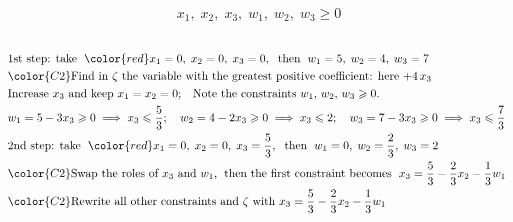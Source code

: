 \documentclass[usenames,dvipsnames,8pt]{beamer}%
\begin{document}
\begin{frame}
\begin{columns}
\begin{column}{0.5\textwidth}
\begin{align*}
        x_1,\;x_2,\;x_3,\;w_1,\;w_2,\;w_3\geqslant 0
      \end{align*}
    \end{column}
  \end{columns}
  \begin{align*}
    &\text{1st step: take }\;{\color{red}x_1 = 0,\;x_2 = 0,\; x_3 = 0},\;\text{ then }\;w_1 = 5,\;w_2 = 4,\;w_3 = 7 \\
    &{\color{C2}\text{Find in $\zeta$ the variable with the greatest positive coefficient: here $+4\,x_3$}} \\
    &\text{Increase $x_3$ and keep $x_1 = x_2 = 0$;\quad Note the constraints $w_1,\,w_2,\,w_3\geqslant 0$.} \\
    &w_1 = 5-3x_3\geqslant 0\;\Longrightarrow\; x_3\leqslant\frac{5}{3};\quad w_2 = 4-2x_3\geqslant 0\;\Longrightarrow\; x_3\leqslant 2;\quad w_3 = 7-3x_3\geqslant 0\;\Longrightarrow\; x_3\leqslant\frac{7}{3}\\
    &\text{2nd step: take }\;{\color{red}x_1 = 0,\; x_2 = 0,\; x_3 = \frac{5}{3}},\;\text{ then }\;w_1 = 0,\;w_2 = \frac{2}{3},\;w_3 = 2\\
    &{\color{C2}\text{Swap the roles of $x_3$ and $w_1$,\;\text{ then the first constraint becomes }\;$x_3 = \frac{5}{3}- \frac{2}{3} x_2 - \frac{1}{3}w_1$ }} \\
    &{\color{C2}\text{Rewrite all other constraints and $\zeta$ with $x_3 = \frac{5}{3} - \frac{2}{3} x_2 - \frac{1}{3}w_1$}} 
  \end{align*}
\end{frame}
\end{document}

